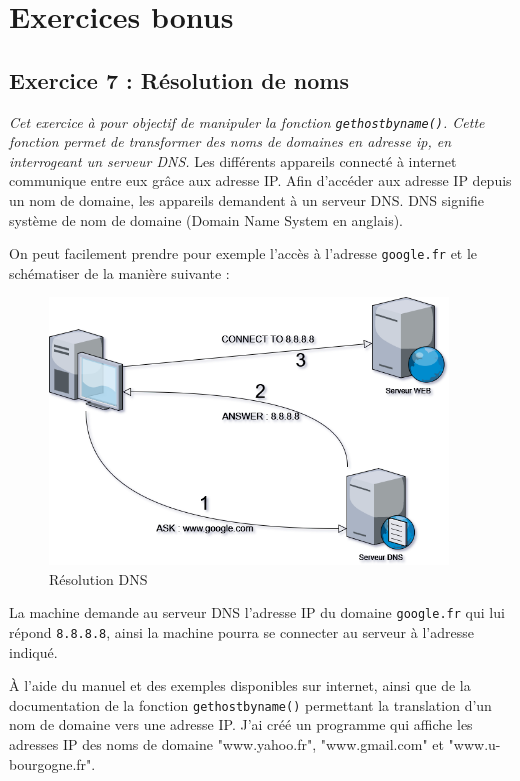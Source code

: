 \section{Exercices bonus}
\subsection{Exercice 7 : Résolution de noms}
\textit{Cet exercice à pour objectif de manipuler la fonction \texttt{gethostbyname()}. Cette fonction permet de transformer des noms de domaines en adresse ip, en interrogeant un serveur DNS.}
Les différents appareils connecté à internet communique entre eux grâce aux adresse IP. Afin d'accéder aux adresse IP depuis un nom de domaine, les appareils demandent à un serveur DNS. DNS signifie système de nom de domaine (Domain Name System en anglais).

On peut facilement prendre pour exemple l'accès à l'adresse \texttt{google.fr} et le schématiser de la manière suivante :

\begin{figure}[H]
\centering
\includegraphics[width=300pt]{./cpp/Pictures/tp7+tp8-DNS}
\caption{Résolution DNS}
\label{Résolution DNS}
\end{figure}

La machine demande au serveur DNS l'adresse IP du domaine \texttt{google.fr} qui lui répond \texttt{8.8.8.8}, ainsi la machine pourra se connecter au serveur à l'adresse indiqué.

À l’aide du manuel et des exemples disponibles sur internet, ainsi que de la documentation de la fonction \texttt{gethostbyname()} permettant la translation d’un nom de domaine vers une adresse IP. J'ai créé un programme qui affiche les adresses IP des noms de domaine "www.yahoo.fr", "www.gmail.com" et "www.u-bourgogne.fr".

\inputminted[linenos,firstline=10, lastline=36]{cpp}{../sources/cpp/TP7-8/getHostByName.c}

